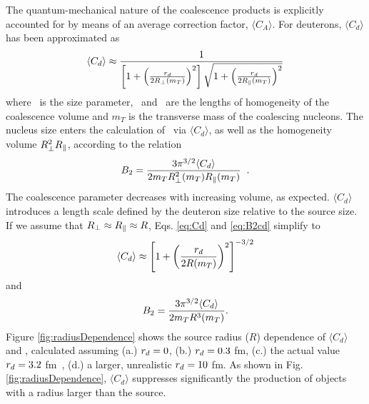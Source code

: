\documentclass[%
 reprint,
 amsmath,amssymb,
 aps,
]{revtex4-1}
\begin{document}
The quantum-mechanical nature of the coalescence products is explicitly accounted for by means of an average correction factor, $\langle C_{A} \rangle$. For deuterons, $\langle C_{d} \rangle$ has been approximated as 
%
\begin{equation}
\langle C_{d} \rangle \approx \frac{1}{\left[1+ \left(\frac{r_{d}}{2R_{\perp}(m_{T})}\right)^{2}\right] \sqrt{1+ \left(\frac{r_{d}}{2R_{\|}(m_{T})}\right)^{2}}}
\label{eq:Cd}
\end{equation}
%
where \dradius~is the size parameter, \rperp~and \rpar~are the lengths of homogeneity of the coalescence volume and $m_{T}$ is the transverse mass of the coalescing nucleons.
The nucleus size enters the calculation of \btwo~via $\langle C_{d} \rangle$, as well as the homogeneity volume $R_{\perp}^{2}R_{\|}$, according to the relation~\cite{Scheibl:1998tk}
%
\begin{equation}
B_{2} = \frac{3\pi^{3/2} \langle C_{d} \rangle}{2m_{T}R_{\perp}^{2}(m_{T})R_{\|}(m_{T})} \;\; .
\label{eq:B2cd}
\end{equation}
%
The coalescence parameter decreases with increasing volume, as expected. 
$\langle C_{d} \rangle$ introduces a length scale defined by the deuteron size relative to the source size. 
If we assume that  $R_{\perp} \approx R_{\|} \approx R$, Eqs. \ref{eq:Cd} and \ref{eq:B2cd} simplify to 
%
\begin{equation}
\langle C_{d} \rangle \approx \left[1+ \left(\frac{r_{d}}{2R(m_{T})}\right)^{2}\right]^{-3/2}
\label{eq:Cdapprox}
\end{equation}
%
and
%
\begin{equation}
B_{2} = \frac{3\pi^{3/2} \langle C_{d} \rangle}{2m_{T}R^{3}(m_{T})}.
\label{eq:B2approx}
\end{equation}
%
Figure \ref{fig:radiusDependence} shows the source radius ($R$) dependence of $\langle C_{d} \rangle$ and \btwo, calculated assuming (a.) $r_{d} = 0$, (b.) $r_{d} = 0.3$ fm, (c.) the actual value $r_{d} = 3.2$ fm~\cite{Mohr:2015ccw}, (d.) a larger, unrealistic $r_{d} = 10$ fm. 
As shown in Fig. \ref{fig:radiusDependence}, $\langle C_{d} \rangle$ suppresses significantly the production of objects with a radius larger than the source. 
\end{document}
